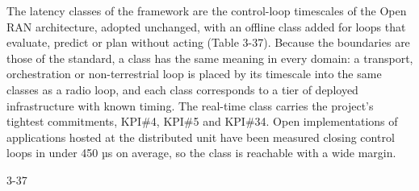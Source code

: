 The latency classes of the framework are the control-loop timescales of
the Open RAN architecture, adopted unchanged, with an offline class
added for loops that evaluate, predict or plan without acting (Table
3-37). Because the boundaries are those of the standard, a class has the
same meaning in every domain: a transport, orchestration or
non-terrestrial loop is placed by its timescale into the same classes as
a radio loop, and each class corresponds to a tier of deployed
infrastructure with known timing. The real-time class carries the
project's tightest commitments, KPI\#4, KPI\#5 and KPI\#34. Open
implementations of applications hosted at the distributed unit have been
measured closing control loops in under 450 µs on average, so the class
is reachable with a wide margin.

\begin{wptable}{3-37}


\end{wptable}
